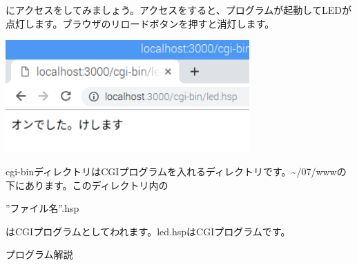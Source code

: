 \documentclass[a4paper,12pt,dvipdfmx]{jarticle}
\begin{document}
にアクセスをしてみましょう。アクセスをすると、プログラムが起動してLEDが点灯します。ブラウザのリロードボタンを押すと消灯します。

\centering
\includegraphics[width=0.7\textwidth]{ome7-img052.png}
\flushleft

cgi-binディレクトリはCGIプログラムを入れるディレクトリです。{\textasciitilde}/07/wwwの下にあります。このディレクトリ内の

”ファイル名”.hsp

はCGIプログラムとしてわれます。led.hspはCGIプログラムです。


\bigskip

\clearpage
プログラム解説
\end{document}

